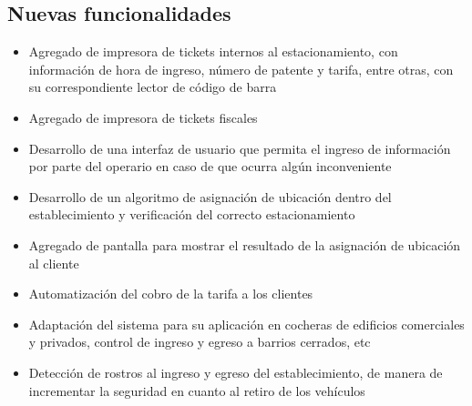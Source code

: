 \subsection{Nuevas funcionalidades}
\begin{itemize}
	\item Agregado de impresora de tickets internos al estacionamiento, con información de hora de ingreso, número de patente y tarifa, entre otras, con su correspondiente lector de código de barra
	\item Agregado de impresora de tickets fiscales
	\item Desarrollo de una interfaz de usuario que permita el ingreso de información por parte del operario en caso de que ocurra algún inconveniente
	\item Desarrollo de un algoritmo de asignación de ubicación dentro del establecimiento y verificación del correcto estacionamiento
	\item Agregado de pantalla para mostrar el resultado de la asignación de ubicación al cliente
	\item Automatización del cobro de la tarifa a los clientes
	\item Adaptación del sistema para su aplicación en cocheras de edificios comerciales y privados, control de ingreso y egreso a barrios cerrados, etc
	\item Detección de rostros al ingreso y egreso del establecimiento, de manera de incrementar la seguridad en cuanto al retiro de los vehículos
\end{itemize}


